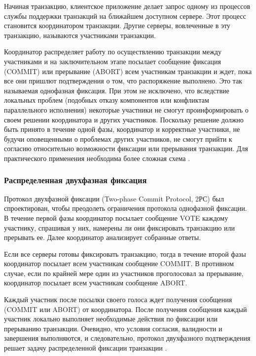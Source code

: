 Начиная транзакцию, клиентское приложение делает запрос одному из процессов службы поддержки транзакций на ближайшем 
доступном сервере. Этот процесс становится координатором транзакции. Другие серверы, вовлеченные в эту транзакцию,
называются участниками транзакции.

Координатор распределяет работу по осуществлению транзакции между участниками и на заключительном этапе посылает 
сообщение фиксация (COMMIT) или прерывание (ABORT) всем участникам транзакции и ждет, пока все они пришлют подтверждения 
о том, что распоряжение выполнено. Это так называемая однофазная фиксация. При этом не исключено, что вследствие локальных 
проблем (подобных отказу компонентов или конфликтам параллельного исполнения) некоторые участники не смогут проинформировать
 о своем решении координатора и других участников. Поскольку решение должно быть принято в течение одной фазы, координатор и 
 корректные участники, не будучи оповещенными о проблемах других участников, не смогут прийти к согласию относительно возможности
фиксации или прерывания транзакции. Для практического применения необходима более сложная схема \autocite{Fix}.

\subsubsection{Распределенная двухфазная фиксация}

Протокол двухфазной фиксации (Two-phase Commit Protocol, 2РС) был спроектирован, чтобы преодолеть ограничения протокола
однофазной фиксации. В течение первой фазы координатор посылает сообщение VOTE каждому участнику, спрашивая у них, намерены 
ли они фиксировать транзакцию или прерывать ее. Далее координатор анализирует собранные ответы.

Если все серверы готовы фиксировать транзакцию, тогда в течение второй фазы координатор посылает всем участникам сообщение COMMIT. 
В противном случае, если по крайней мере один из участников проголосовал за прерывание, координатор посылает всем участникам сообщение ABORT.

Каждый участник после посылки своего голоса ждет получения сообщения (COMMIT или ABORT) от координатора. После получения сообщения каждый 
участник локально выполняет необходимые действия по фиксации или прерыванию транзакции. Очевидно, что условия согласия, валидности и 
завершения выполняются, и следовательно, протокол двухфазного подтверждения решает задачу распределенной фиксации транзакции \autocite{Fix}.

